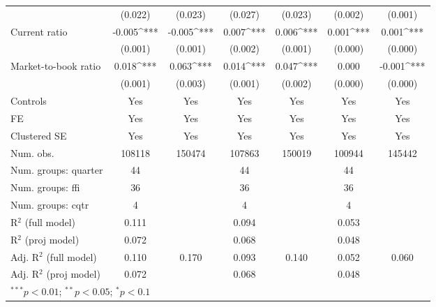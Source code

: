 \begin{sidewaystable}[h]
\begin{center}
{\begin{tabular}{l S[table-format=6.6] S[table-format=6.6] S[table-format=6.6] S[table-format=6.6] S[table-format=6.6] S[table-format=6.6]}
                                    & (0.022)      & (0.023)      & (0.027)      & (0.023)      & (0.002)      & (0.001)      \\
Current ratio                       & -0.005^{***} & -0.005^{***} & 0.007^{***}  & 0.006^{***}  & 0.001^{***}  & 0.001^{***}  \\
                                    & (0.001)      & (0.001)      & (0.002)      & (0.001)      & (0.000)      & (0.000)      \\
Market-to-book ratio                & 0.018^{***}  & 0.063^{***}  & 0.014^{***}  & 0.047^{***}  & 0.000        & -0.001^{***} \\
                                    & (0.001)      & (0.003)      & (0.001)      & (0.002)      & (0.000)      & (0.000)      \\
\midrule
Controls                            & {Yes}        & {Yes}        & {Yes}        & {Yes}        & {Yes}        & {Yes}        \\
FE                                  & {Yes}        & {Yes}        & {Yes}        & {Yes}        & {Yes}        & {Yes}        \\
Clustered SE                        & {Yes}        & {Yes}        & {Yes}        & {Yes}        & {Yes}        & {Yes}        \\
Num. obs.                           & 108118       & 150474       & 107863       & 150019       & 100944       & 145442       \\
Num. groups: quarter                & 44           &              & 44           &              & 44           &              \\
Num. groups: ffi                    & 36           &              & 36           &              & 36           &              \\
Num. groups: cqtr                   & 4            &              & 4            &              & 4            &              \\
R$^2$ (full model)                  & 0.111        &              & 0.094        &              & 0.053        &              \\
R$^2$ (proj model)                  & 0.072        &              & 0.068        &              & 0.048        &              \\
Adj. R$^2$ (full model)             & 0.110        & 0.170        & 0.093        & 0.140        & 0.052        & 0.060        \\
Adj. R$^2$ (proj model)             & 0.072        &              & 0.068        &              & 0.048        &              \\
\bottomrule
{}
\end{tabular}}
\label{regcompare}
\end{center}
\end{sidewaystable}
